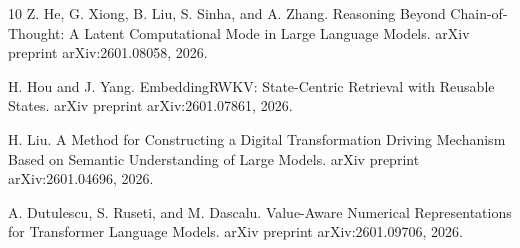 \documentclass{article}
\begin{document}
\begin{thebibliography}{10}
 Z. He, G. Xiong, B. Liu, S. Sinha, and A. Zhang. Reasoning Beyond Chain-of-Thought: A Latent Computational Mode in Large Language Models. arXiv preprint arXiv:2601.08058, 2026.

 H. Hou and J. Yang. EmbeddingRWKV: State-Centric Retrieval with Reusable States. arXiv preprint arXiv:2601.07861, 2026.

 H. Liu. A Method for Constructing a Digital Transformation Driving Mechanism Based on Semantic Understanding of Large Models. arXiv preprint arXiv:2601.04696, 2026.

 A. Dutulescu, S. Ruseti, and M. Dascalu. Value-Aware Numerical Representations for Transformer Language Models. arXiv preprint arXiv:2601.09706, 2026.

\end{thebibliography}
\end{document}
